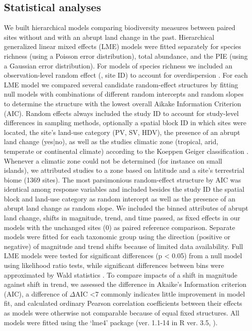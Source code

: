\subsection{Statistical analyses} 
\label{C03_0204}
We built hierarchical models comparing biodiversity measures between paired sites without and with an abrupt land change in the past. Hierarchical generalized linear mixed effects (LME) models were fitted separately for species richness (using a Poisson error distribution), total abundance, and the PIE (using a Gaussian error distribution). For models of species richness we included an observation-level random effect (\ie, site ID) to account for overdispersion  \citep{Harrison2015}. For each LME model we compared several candidate random-effect structures by fitting null models with combinations of different random intercepts and random slopes to determine the structure with the lowest overall Aikake Information Criterion (AIC). Random effects always included the study ID to account for study-level differences in sampling methods, optionally a spatial block ID in which sites were located, the site’s land-use category (PV, SV, HDV), the presence of an abrupt land change (yes|no), as well as the studies climatic zone (tropical, arid, temperate or continental climate) according to the Koeppen Geiger classification \citep{Peel2007}. Whenever a climatic zone could not be determined (for instance on small islands), we attributed studies to a zone based on latitude and a site’s terrestrial biome (1369 sites). The most parsimonious random-effect structure by AIC was identical among response variables and included \textendash besides the study ID \textendash the spatial block and land-use category as random intercept as well as the presence of an abrupt land change as random slope. We included the binned attributes of abrupt land change, \eg shifts in magnitude, trend, and time passed, as fixed effects in our models with the unchanged sites (0) as paired reference comparison. Separate models were fitted for each taxonomic group using the direction (positive or negative) of magnitude and trend shifts because of limited data availability. Full LME models were tested for significant differences (p < 0.05) from a null model using likelihood ratio tests, while significant differences between bins were approximated by Wald statistics \citep{lme4}. To compare impacts of a shift in magnitude against shift in trend, we assessed the difference in Akaike’s Information criterion (AIC), a difference of $\Delta$AIC <7 commonly indicates little improvement in model fit, and calculated ordinary Pearson correlation coefficients between their effects as models were otherwise not comparable because of equal fixed structures. All models were fitted using the ‘lme4’ package (ver. 1.1-14 in R ver. 3.5, \cite{lme4,RTeam2014}). 

